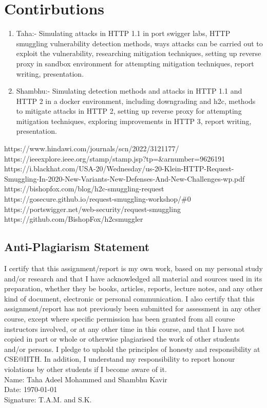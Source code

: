 \documentclass[conference]{IEEEtran}
\begin{document}
\section{Contirbutions}
\begin{enumerate}
    \item Taha:- Simulating attacks in HTTP 1.1 in port swigger labs, HTTP smuggling vulnerability detection methods, ways attacks can be carried out to exploit the vulnerability, researching mitigation techniques, setting up reverse proxy in sandbox environment for attempting mitigation techniques, report writing, presentation.
    \item Shambhu:- Simulating detection methods and attacks in HTTP 1.1 and HTTP 2 in a docker environment, including downgrading and h2c, methods to mitigate attacks in HTTP 2, setting up reverse proxy for attempting mitigation techniques, exploring improvements in HTTP 3, report writing, presentation.
\end{enumerate}

\begin{thebibliography}{9}

 https://www.hindawi.com/journals/scn/2022/3121177/
 https://ieeexplore.ieee.org/stamp/stamp.jsp?tp=\&arnumber=9626191
 https://i.blackhat.com/USA-20/Wednesday/us-20-Klein-HTTP-Request-Smuggling-In-2020-New-Variants-New-Defenses-And-New-Challenges-wp.pdf
 https://bishopfox.com/blog/h2c-smuggling-request 
 https://gosecure.github.io/request-smuggling-workshop/\#0
 https://portswigger.net/web-security/request-smuggling
 https://github.com/BishopFox/h2csmuggler

\end{thebibliography}



\subsection*{Anti-Plagiarism Statement}
I certify that this assignment/report is my own work, based on my personal study and/or research and that I have acknowledged all material and sources used in its preparation, whether they be books, articles, reports, lecture notes, and any other kind of document, electronic or personal communication. I also certify that this assignment/report has not previously been submitted for assessment in any other course, except where specific permission has been granted from all course instructors involved, or at any other time in this course, and that I have not copied in part or whole or otherwise plagiarised the work of other students and/or persons. I pledge to uphold the principles of honesty and responsibility at CSE@IITH. In addition, I understand my responsibility to report honour violations by other students if I become aware of it.\\

\noindent
Name: Taha Adeel Mohammed and Shambhu Kavir \\
Date: \today \\
Signature: T.A.M. and S.K.
\end{document}
